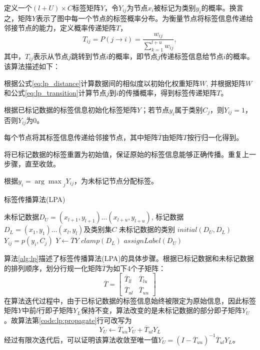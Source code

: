 定义一个$(l+U)\times C$标签矩阵$Y$，令$Y_{ij}$为节点$x_{i}$被标记为类别$y_{i}$的概率。换言之，矩阵$Y$表示了图中每一个节点的标签概率分布。为衡量节点将标签信息传递给邻接节点的能力，定义概率传递矩阵$T$，
\begin{equation}
\label{eq:lp_transition}
T_{ij}=P(j\rightarrow i)=\frac{w_{ij}}{\sum_{k=1}^{l+u}w_{ij}},
\end{equation}
其中，$T_{ij}$表示从节点$j$跳转到节点$i$的概率，即节点$j$传递标签信息给节点$i$的概率。该算法描述如下：
\begin{asparaenum}
\item 根据公式\ref{eq:lp_distance}计算数据间的相似度以初始化权重矩阵$W$, 并根据矩阵$W$和公式\ref{eq:lp_transition}计算节点$j$到$i$的传播概率，得到标签传递矩阵$T$。
\item 根据已标记数据的标签信息初始化标签矩阵$Y$；若节点$y_{i}$属于类别$C_{j}$，则$Y_{ij}=1$，否则$Y_{ij}$为0。
\item 每个节点将其标签信息传递给邻接节点，其中矩阵$\overline{T}$由矩阵$T$按行归一化得到。
\item 将已标记数据的标签重置为初始值，保证原始的标签信息能够正确传播。重复上一步骤，直至收敛。
\item 根据$y_{i}={\arg \max}_{j}Y_{ij}$，为未标记节点分配标签。
\end{asparaenum}

\begin{algorithm}
\caption{标签传播算法(LPA)}
\label{alg:lp}
\begin{algorithmic}[1]
\Input 未标记数据$D_{U}=(x_{l+1},y_{l+1})...(x_{l+u},y_{l+u})$, 标记数据$D_{L}=(x_{1},y_{1})...(x_{l},y_{l})$及类别集$C$
\Output 未标记数据的类别
\State $initial(D_{U}, D_{L})$ 
 
\State $Y_{ij} = p(y_{i},C_{j})$
\EndFor
\EndFor
\Repeat
\State $Y\leftarrow \overline{T}Y$ 
\label{code:lp:propagate}
\State $clamp(D_{L})$ 
\label{code:lp:clamp}
\State $assignLabel(D_{U})$
\end{algorithmic}
\end{algorithm}

算法\ref{alg:lp}描述了标签传播算法(LPA)的具体步骤。根据已标记数据和未标记数据的排列顺序，划分行规一化矩阵$\overline{T}$为如下4个子矩阵：
\begin{equation}
\overline{T}=\begin{bmatrix}
\overline{T}_{ll} & \overline{T}_{lu} \\ 
\overline{T}_{ul} & \overline{T}_{uu}
\end{bmatrix}
\end{equation}
在算法迭代过程中，由于已标记数据的标签信息始终被限定为原始信息，因此标签矩阵$Y$中前$l$行即子矩阵$Y_{L}$保持不变，算法改变的是未标记数据的部分即子矩阵$Y_{U}$。故算法第\ref{code:lp:propagate}行可改写为
\begin{equation}
Y_{U} \leftarrow \overline{T}_{uu}Y_{U}+\overline{T}_{ul}Y_{L}
\end{equation}
经过有限次迭代后，可以证明该算法收敛至唯一值$Y_{U}=(I-\overline{T}_{uu})^{-1}\overline{T}_{ul}Y_{L}$。

